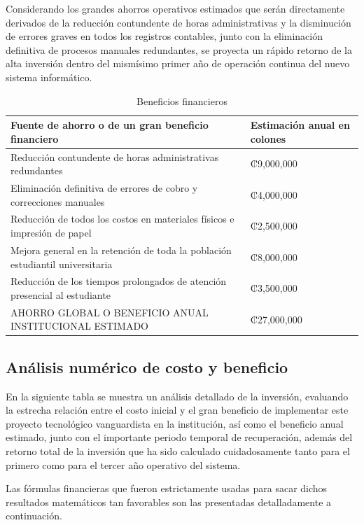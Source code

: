 \documentclass[11pt,spanish]{article}
\begin{document}
Considerando los grandes ahorros operativos estimados que serán directamente derivados de la reducción contundente de horas administrativas y la disminución de errores graves en todos los registros contables, junto con la eliminación definitiva de procesos manuales redundantes, se proyecta un rápido retorno de la alta inversión dentro del mismísimo primer año de operación continua del nuevo sistema informático.

\begin{table}[H]
\centering
\small
\caption{Beneficios financieros}\label{tab:beneficios-financieros}
\begin{tabularx}{\textwidth}{Y p{5cm}}
\toprule
\textbf{Fuente de ahorro o de un gran beneficio financiero} & \textbf{Estimación anual en colones} \\
\midrule
Reducción contundente de horas administrativas redundantes & ₡9,000,000 \\
Eliminación definitiva de errores de cobro y correcciones manuales & ₡4,000,000 \\
Reducción de todos los costos en materiales físicos e impresión de papel & ₡2,500,000 \\
Mejora general en la retención de toda la población estudiantil universitaria & ₡8,000,000 \\
Reducción de los tiempos prolongados de atención presencial al estudiante & ₡3,500,000 \\
AHORRO GLOBAL O BENEFICIO ANUAL INSTITUCIONAL ESTIMADO & ₡27,000,000 \\
\bottomrule
\end{tabularx}
\end{table}

\subsection{Análisis numérico de costo y beneficio}

En la siguiente tabla se muestra un análisis detallado de la inversión, evaluando la estrecha relación entre el costo inicial y el gran beneficio de implementar este proyecto tecnológico vanguardista en la institución, así como el beneficio anual estimado, junto con el importante periodo temporal de recuperación, además del retorno total de la inversión que ha sido calculado cuidadosamente tanto para el primero como para el tercer año operativo del sistema.

Las fórmulas financieras que fueron estrictamente usadas para sacar dichos resultados matemáticos tan favorables son las presentadas detalladamente a continuación.
\end{document}
